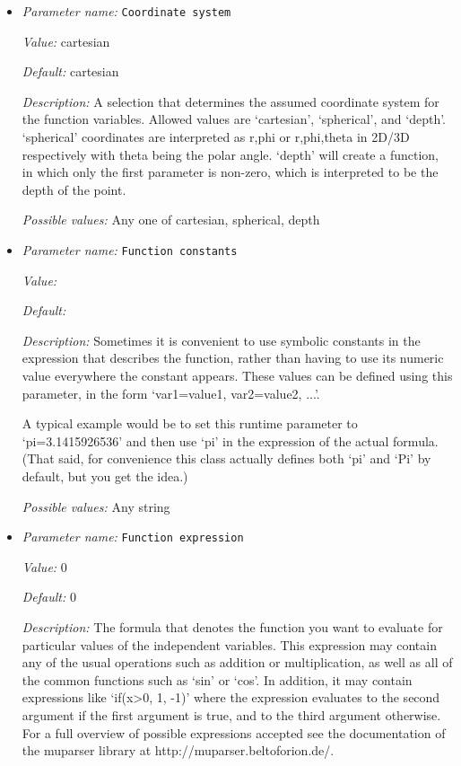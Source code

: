 \begin{itemize}
\item {\it Parameter name:} {\tt Coordinate system}
\label{parameters:Initial composition model/Function/Coordinate system}


{\it Value:} cartesian


{\it Default:} cartesian


{\it Description:} A selection that determines the assumed coordinate system for the function variables. Allowed values are `cartesian', `spherical', and `depth'. `spherical' coordinates are interpreted as r,phi or r,phi,theta in 2D/3D respectively with theta being the polar angle. `depth' will create a function, in which only the first parameter is non-zero, which is interpreted to be the depth of the point.


{\it Possible values:} Any one of cartesian, spherical, depth
\item {\it Parameter name:} {\tt Function constants}
\label{parameters:Initial composition model/Function/Function constants}


{\it Value:} 


{\it Default:} 


{\it Description:} Sometimes it is convenient to use symbolic constants in the expression that describes the function, rather than having to use its numeric value everywhere the constant appears. These values can be defined using this parameter, in the form `var1=value1, var2=value2, ...'.

A typical example would be to set this runtime parameter to `pi=3.1415926536' and then use `pi' in the expression of the actual formula. (That said, for convenience this class actually defines both `pi' and `Pi' by default, but you get the idea.)


{\it Possible values:} Any string
\item {\it Parameter name:} {\tt Function expression}
\label{parameters:Initial composition model/Function/Function expression}


{\it Value:} 0


{\it Default:} 0


{\it Description:} The formula that denotes the function you want to evaluate for particular values of the independent variables. This expression may contain any of the usual operations such as addition or multiplication, as well as all of the common functions such as `sin' or `cos'. In addition, it may contain expressions like `if(x>0, 1, -1)' where the expression evaluates to the second argument if the first argument is true, and to the third argument otherwise. For a full overview of possible expressions accepted see the documentation of the muparser library at http://muparser.beltoforion.de/.


\end{itemize}
